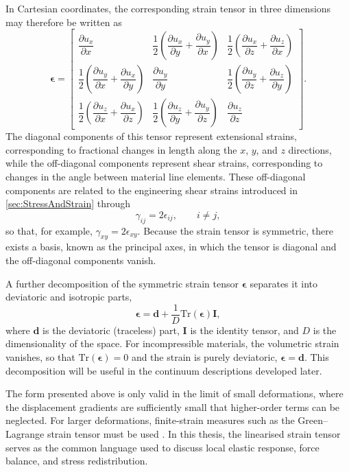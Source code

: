 In Cartesian coordinates, the corresponding strain tensor in three dimensions may therefore be written as
\[
    \bm{\epsilon} =
    \begin{bmatrix}
        \dfrac{\partial u_x}{\partial x} & \dfrac{1}{2}\left( \dfrac{\partial u_x}{\partial y} + \dfrac{\partial u_y}{\partial x} \right) & \dfrac{1}{2}\left( \dfrac{\partial u_x}{\partial z} + \dfrac{\partial u_z}{\partial x} \right) \\[6pt]
        \dfrac{1}{2}\left( \dfrac{\partial u_y}{\partial x} + \dfrac{\partial u_x}{\partial y} \right) & \dfrac{\partial u_y}{\partial y} & \dfrac{1}{2}\left( \dfrac{\partial u_y}{\partial z} + \dfrac{\partial u_z}{\partial y} \right) \\[6pt]
        \dfrac{1}{2}\left( \dfrac{\partial u_z}{\partial x} + \dfrac{\partial u_x}{\partial z} \right) & \dfrac{1}{2}\left( \dfrac{\partial u_z}{\partial y} + \dfrac{\partial u_y}{\partial z} \right) & \dfrac{\partial u_z}{\partial z}
    \end{bmatrix}.
\]
The diagonal components of this tensor represent extensional strains, corresponding to fractional changes in length along the $x$, $y$, and $z$ directions, while the off-diagonal components represent shear strains, corresponding to changes in the angle between material line elements. These off-diagonal components are related to the engineering shear strains introduced in \cref{sec:StressAndStrain} through
\begin{equation}
    \gamma_{ij} = 2\epsilon_{ij}, \qquad i \neq j,
    \label{eq:engineeringShearStrain}
\end{equation}
so that, for example, $\gamma_{xy} = 2\epsilon_{xy}$. Because the strain tensor is symmetric, there exists a basis, known as the principal axes, in which the tensor is diagonal and the off-diagonal components vanish.

A further decomposition of the symmetric strain tensor $\bm{\epsilon}$ separates it into deviatoric and isotropic parts,
\[
    \bm{\epsilon} = \bm{d} + \frac{1}{D} \mathrm{Tr}(\bm{\epsilon}) \bm{I},
\]
where $\bm{d}$ is the deviatoric (traceless) part, $\bm{I}$ is the identity tensor, and $D$ is the dimensionality of the space. For incompressible materials, the volumetric strain vanishes, so that $\mathrm{Tr}(\bm{\epsilon}) = 0$ and the strain is purely deviatoric, $\bm{\epsilon} = \bm{d}$. This decomposition will be useful in the continuum descriptions developed later.

The form presented above is only valid in the limit of small deformations, where the displacement gradients are sufficiently small that higher-order terms can be neglected. For larger deformations, finite-strain measures such as the Green–Lagrange strain tensor must be used \cite{TruesdellNoll1992}. In this thesis, the linearised strain tensor serves as the common language used to discuss local elastic response, force balance, and stress redistribution.

